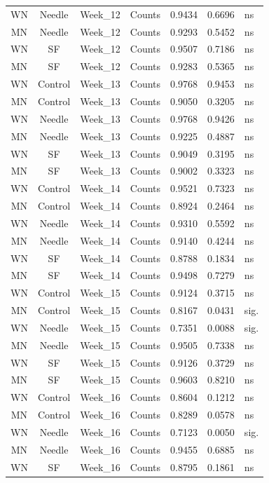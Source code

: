 \documentclass[
  12pt,
  letterpaper,
]{article}
\begin{document}
\begin{longtable}{ccclrrl}
WN & Needle & Week\_12 & Counts & 0.9434 & 0.6696 & ns \\ 
MN & Needle & Week\_12 & Counts & 0.9293 & 0.5452 & ns \\ 
WN & SF & Week\_12 & Counts & 0.9507 & 0.7186 & ns \\ 
MN & SF & Week\_12 & Counts & 0.9283 & 0.5365 & ns \\ 
WN & Control & Week\_13 & Counts & 0.9768 & 0.9453 & ns \\ 
MN & Control & Week\_13 & Counts & 0.9050 & 0.3205 & ns \\ 
WN & Needle & Week\_13 & Counts & 0.9768 & 0.9426 & ns \\ 
MN & Needle & Week\_13 & Counts & 0.9225 & 0.4887 & ns \\ 
WN & SF & Week\_13 & Counts & 0.9049 & 0.3195 & ns \\ 
MN & SF & Week\_13 & Counts & 0.9002 & 0.3323 & ns \\ 
WN & Control & Week\_14 & Counts & 0.9521 & 0.7323 & ns \\ 
MN & Control & Week\_14 & Counts & 0.8924 & 0.2464 & ns \\ 
WN & Needle & Week\_14 & Counts & 0.9310 & 0.5592 & ns \\ 
MN & Needle & Week\_14 & Counts & 0.9140 & 0.4244 & ns \\ 
WN & SF & Week\_14 & Counts & 0.8788 & 0.1834 & ns \\ 
MN & SF & Week\_14 & Counts & 0.9498 & 0.7279 & ns \\ 
WN & Control & Week\_15 & Counts & 0.9124 & 0.3715 & ns \\ 
MN & Control & Week\_15 & Counts & 0.8167 & 0.0431 & sig. \\ 
WN & Needle & Week\_15 & Counts & 0.7351 & 0.0088 & sig. \\ 
MN & Needle & Week\_15 & Counts & 0.9505 & 0.7338 & ns \\ 
WN & SF & Week\_15 & Counts & 0.9126 & 0.3729 & ns \\ 
MN & SF & Week\_15 & Counts & 0.9603 & 0.8210 & ns \\ 
WN & Control & Week\_16 & Counts & 0.8604 & 0.1212 & ns \\ 
MN & Control & Week\_16 & Counts & 0.8289 & 0.0578 & ns \\ 
WN & Needle & Week\_16 & Counts & 0.7123 & 0.0050 & sig. \\ 
MN & Needle & Week\_16 & Counts & 0.9455 & 0.6885 & ns \\ 
WN & SF & Week\_16 & Counts & 0.8795 & 0.1861 & ns \\ 

\end{longtable}
\end{document}
